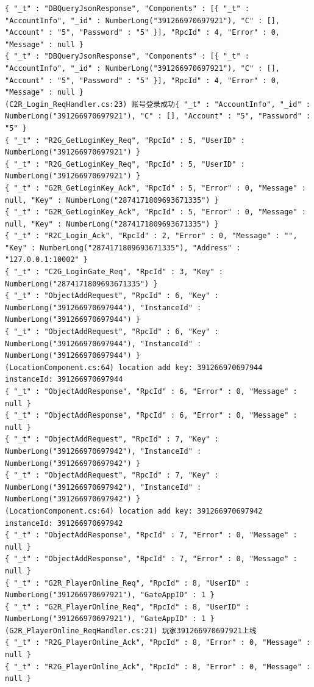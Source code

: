 \documentclass[9pt, b5paper]{article}
\begin{document}
\begin{verbatim}
{ "_t" : "DBQueryJsonResponse", "Components" : [{ "_t" : "AccountInfo", "_id" : NumberLong("391266970697921"), "C" : [], "Account" : "5", "Password" : "5" }], "RpcId" : 4, "Error" : 0, "Message" : null }
{ "_t" : "DBQueryJsonResponse", "Components" : [{ "_t" : "AccountInfo", "_id" : NumberLong("391266970697921"), "C" : [], "Account" : "5", "Password" : "5" }], "RpcId" : 4, "Error" : 0, "Message" : null }
(C2R_Login_ReqHandler.cs:23) 账号登录成功{ "_t" : "AccountInfo", "_id" : NumberLong("391266970697921"), "C" : [], "Account" : "5", "Password" : "5" }
{ "_t" : "R2G_GetLoginKey_Req", "RpcId" : 5, "UserID" : NumberLong("391266970697921") }
{ "_t" : "R2G_GetLoginKey_Req", "RpcId" : 5, "UserID" : NumberLong("391266970697921") }
{ "_t" : "G2R_GetLoginKey_Ack", "RpcId" : 5, "Error" : 0, "Message" : null, "Key" : NumberLong("2874171809693671335") }
{ "_t" : "G2R_GetLoginKey_Ack", "RpcId" : 5, "Error" : 0, "Message" : null, "Key" : NumberLong("2874171809693671335") }
{ "_t" : "R2C_Login_Ack", "RpcId" : 2, "Error" : 0, "Message" : "", "Key" : NumberLong("2874171809693671335"), "Address" : "127.0.0.1:10002" }
{ "_t" : "C2G_LoginGate_Req", "RpcId" : 3, "Key" : NumberLong("2874171809693671335") }
{ "_t" : "ObjectAddRequest", "RpcId" : 6, "Key" : NumberLong("391266970697944"), "InstanceId" : NumberLong("391266970697944") }
{ "_t" : "ObjectAddRequest", "RpcId" : 6, "Key" : NumberLong("391266970697944"), "InstanceId" : NumberLong("391266970697944") }
(LocationComponent.cs:64) location add key: 391266970697944 instanceId: 391266970697944
{ "_t" : "ObjectAddResponse", "RpcId" : 6, "Error" : 0, "Message" : null }
{ "_t" : "ObjectAddResponse", "RpcId" : 6, "Error" : 0, "Message" : null }
{ "_t" : "ObjectAddRequest", "RpcId" : 7, "Key" : NumberLong("391266970697942"), "InstanceId" : NumberLong("391266970697942") }
{ "_t" : "ObjectAddRequest", "RpcId" : 7, "Key" : NumberLong("391266970697942"), "InstanceId" : NumberLong("391266970697942") }
(LocationComponent.cs:64) location add key: 391266970697942 instanceId: 391266970697942
{ "_t" : "ObjectAddResponse", "RpcId" : 7, "Error" : 0, "Message" : null }
{ "_t" : "ObjectAddResponse", "RpcId" : 7, "Error" : 0, "Message" : null }
{ "_t" : "G2R_PlayerOnline_Req", "RpcId" : 8, "UserID" : NumberLong("391266970697921"), "GateAppID" : 1 }
{ "_t" : "G2R_PlayerOnline_Req", "RpcId" : 8, "UserID" : NumberLong("391266970697921"), "GateAppID" : 1 }
(G2R_PlayerOnline_ReqHandler.cs:21) 玩家391266970697921上线
{ "_t" : "R2G_PlayerOnline_Ack", "RpcId" : 8, "Error" : 0, "Message" : null }
{ "_t" : "R2G_PlayerOnline_Ack", "RpcId" : 8, "Error" : 0, "Message" : null }

\end{verbatim}
\end{document}

